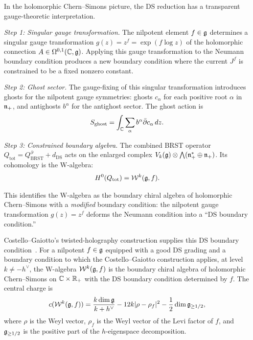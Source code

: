 \begin{construction}
In the holomorphic Chern--Simons picture, the DS reduction has a
transparent gauge-theoretic interpretation.

\emph{Step 1: Singular gauge transformation.} The nilpotent element
$f \in \mathfrak{g}$ determines a singular gauge transformation
$g(z) = z^f = \exp(f \log z)$ of the holomorphic connection
$A \in \Omega^{0,1}(\mathbb{C}, \mathfrak{g})$. Applying this gauge transformation to
the Neumann boundary condition produces a new boundary condition where
the current $J^f$ is constrained to be a fixed nonzero constant.

\emph{Step 2: Ghost sector.} The gauge-fixing of this singular
transformation introduces ghosts for the nilpotent gauge symmetries:
ghosts $c_\alpha$ for each positive root $\alpha$ in $\mathfrak{n}_+$, and
antighosts $b^\alpha$ for the antighost sector. The ghost action is
\[
S_{\mathrm{ghost}} = \int_{\mathbb{C}} \sum_\alpha b^\alpha \bar{\partial} c_\alpha \, dz.
\]

\emph{Step 3: Constrained boundary algebra.} The combined BRST
operator $Q_{\mathrm{tot}} = Q_{\mathrm{BRST}}^\partial + d_{\mathrm{DS}}$
acts on the enlarged complex $V_k(\mathfrak{g}) \otimes \bigwedge(\mathfrak{n}_+^* \oplus \mathfrak{n}_+)$.
Its cohomology is the W-algebra:
\[
H^0(Q_{\mathrm{tot}}) = \mathcal{W}^k(\mathfrak{g}, f).
\]

This identifies the W-algebra as the boundary chiral algebra of
holomorphic Chern--Simons with a \emph{modified} boundary condition:
the nilpotent gauge transformation $g(z) = z^f$ deforms the Neumann
condition into a ``DS boundary condition.''
\end{construction}

\begin{theorem}
Costello--Gaiotto's twisted-holography construction supplies this
DS boundary condition~\cite{costello-gaiotto}. For a nilpotent
$f \in \mathfrak{g}$ equipped with a good DS grading and a boundary condition
to which the Costello--Gaiotto construction applies, at level
$k \neq -h^\vee$, the W-algebra
$\mathcal{W}^k(\mathfrak{g}, f)$ is the boundary chiral algebra of holomorphic
Chern--Simons on $\mathbb{C} \times \mathbb{R}_+$ with the DS boundary condition
determined by $f$. The central charge is
\[
c(\mathcal{W}^k(\mathfrak{g}, f))
 = \frac{k \dim \mathfrak{g}}{k + h^\vee}
 - 12 k |\rho - \rho_f|^2
 - \frac{1}{2} \dim \mathfrak{g}_{\geq 1/2},
\]
where $\rho$ is the Weyl vector, $\rho_f$ is the Weyl vector of the
Levi factor of $f$, and $\mathfrak{g}_{\geq 1/2}$ is the positive part of the
$h$-eigenspace decomposition.
\end{theorem}

